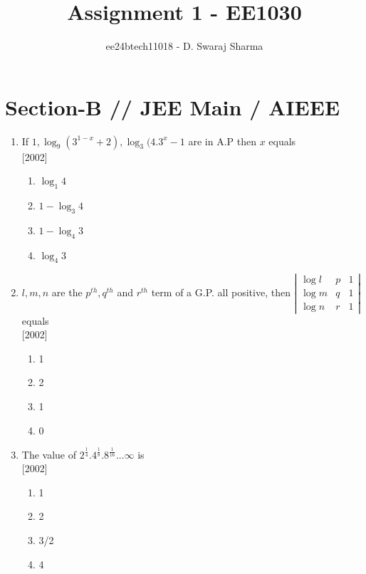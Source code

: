 \documentclass[journal,12pt,twocolumn]{IEEEtran}
\theoremstyle{remark}
\begin{document}

\vspace{3cm}

\title{Assignment 1 - EE1030}
\author{ee24btech11018 - D. Swaraj Sharma}
\maketitle
\newpage
\bigskip

\renewcommand{\thefigure}{\theenumi}
\renewcommand{\thetable}{\theenumi}

\section*{\textbf{Section-B} // \textbf{JEE Main} / \textbf{AIEEE}}

\begin{enumerate}[label={\arabic*.}]


\item {If $ 1, \log_9 (3^{1-x} +2), \log_3 (4.3^x -1$ are in A.P then $x$ equals}\\ \hfill{[2002]} 
\begin{enumerate}[label={(\alph*)}]
\item  {$\log_1 4$}
 \item {$1-\log_3 4$}
 \item {$1-\log_4 3$}
 \item {$\log_4 3$}
\end{enumerate}
\item {$l, m, n$ are the $p^{th}, q^{th}$ and $r^{th}$ term of a G.P. all positive, then $\left|\begin{matrix} \log l & p & 1 \\ \log m & q & 1 \\ \log n & r & 1 \end{matrix}\right|$ equals}\\ \hfill{[2002]}
\begin{enumerate}[label={(\alph*)}]
\item{1}
\item{2}
\item{1}
\item{0}
\end{enumerate}

\item {The value of $2^{\frac{1}{4}} . 4^{\frac{1}{8}} . 8^{\frac{1}{16}} \ldots \infty$ is}\\ \hfill{[2002]}
\begin{enumerate}[label={(\alph*)}]
\item  {1}
\item  {2}
\item  {3/2}
\item  {4}
\end{enumerate}


\end{enumerate}
\end{document}
